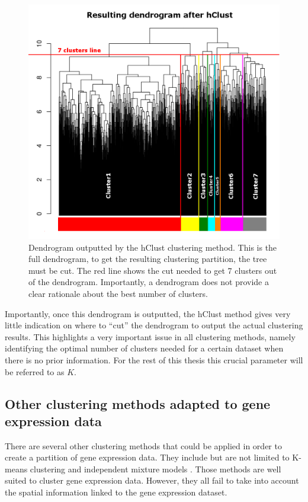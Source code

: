 	\begin{figure}[h]
\centerline{\includegraphics[width=\linewidth]{gfx/chapter3/dendro.png}}
\caption{Dendrogram outputted by the hClust clustering method. This is the full dendrogram, to get the resulting clustering partition, the tree must be cut. The red line shows the cut needed to get 7 clusters out of the dendrogram. Importantly, a dendrogram does not provide a clear rationale about the best number of clusters.}\label{fig:dendro}
	\end{figure}	
	
	Importantly, once this dendrogram is outputted, the hClust method gives very little indication on where to ``cut'' the dendrogram to output the actual clustering results. This highlights a very important issue in all clustering methods, namely identifying the optimal number of clusters needed for a certain dataset when there is no prior information. For the rest of this thesis this crucial parameter will be referred to as $K$.\\

 
	\subsection{Other clustering methods adapted to gene expression data}
	There are several other clustering methods that could be applied in order to create a partition of gene expression data. They include but are not limited to K-means clustering \citep{macqueen67} and independent mixture models \citep{dempster77}. Those methods are well suited to cluster gene expression data. However, they all fail to take into account the spatial information linked to the gene expression dataset.


